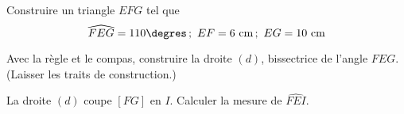 \begin{myenumerate}
  \item Construire un triangle $EFG$ tel que
\[\widehat{FEG}=110\degres\,;~EF=6~\mbox{cm}\,;~EG=10~\mbox{cm}\]
\item Avec la règle et le compas, construire la droite $(d)$, bissectrice de l'angle $\widehat{FEG}$. (Laisser les traits de construction.)
\item La droite $(d)$ coupe $[FG]$ en $I$. Calculer la mesure de $\widehat{FEI}$.
\end{myenumerate}